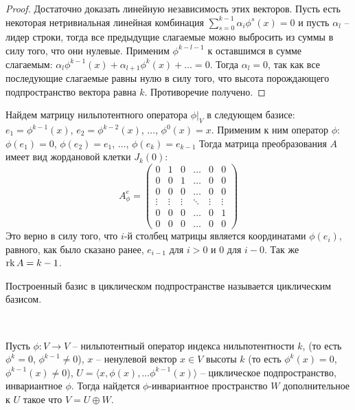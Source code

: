 \begin{proof}
    Достаточно доказать линейную независимость этих векторов. Пусть есть некоторая нетривиальная 
    линейная комбинация $\displaystyle\sum_{s = 0}^{k-1} \alpha_i \phi^{s}(x) = 0$ 
    и пусть $\alpha_l$ -- лидер строки, тогда все предыдущие слагаемые можно выбросить из суммы 
    в силу того, что они нулевые. Применим $\phi^{k-l-1}$ к оставшимся в сумме слагаемым: 
    $\alpha_l \phi^{k-1}(x) + \alpha_{l+1} \phi^{k}(x) + \dots = 0$.
    Тогда $\alpha_l = 0$, так как все последующие слагаемые равны нулю в силу того, что высота 
    порождающего подпространство вектора равна $k$. Противоречие получено.
\end{proof}

\begin{note}
    Найдем матрицу нильпотентного оператора $\phi \vert_{V}$ в следующем базисе: 
    $e_1 = \phi^{k-1}(x)$, $e_2 = \phi^{k-2}(x)$, $\dots$, $\phi^0(x) = x$.
    Применим к ним оператор $\phi$: $\phi(e_1) = 0$, $\phi(e_2) = e_1$, $\dots$, $\phi(e_k) = e_{k-1}$ 
    Тогда матрица преобразования $A$ имеет вид жордановой клетки $J_k(0)$:
    \[A_{\phi}^{e} = \begin{pmatrix}
		0      & 1      & 0      & \dots  & 0      & 0\\
		0      & 0      & 1      & \dots  & 0      & 0\\
        0      & 0      & 0      & \dots  & 0      & 0\\
		\vdots & \vdots & \vdots & \ddots & \vdots & \vdots\\
        0      & 0      & 0      & \dots  & 0      & 1\\
		0      & 0      & 0      & \dots  & 0      & 0
	\end{pmatrix}\]
    Это верно в силу того, что $i$-й столбец матрицы является координатами $\phi(e_i)$, равного, 
    как было сказано ранее, $e_{i-1}$ для $i > 0$ и 0 для $i - 0$. Так же $\operatorname{rk} A = k-1$.
\end{note}

\begin{definition}
    Построенный базис в циклическом подпространстве называется циклическим базисом.
\end{definition}

\begin{theorem}~
    \label{th5.3}

    Пусть $\phi: V \to V$ -- нильпотентный оператор индекса нильпотентности $k$, 
    (то есть $\phi^k = 0$, $\phi^{k-1} \neq 0$), $x$ -- ненулевой вектор $x \in V$ 
    высоты $k$ (то есть $\phi^k(x) = 0$, $\phi^{k-1}(x) \neq 0$),
    $U = \langle x, \phi(x), \dots \phi^{k-1}(x) \rangle$ -- циклическое подпространство, инвариантное $\phi$.
    Тогда найдется $\phi$-инвариантное пространство $W$ дополнительное к $U$ такое что $V = U \oplus W$.
\end{theorem}

